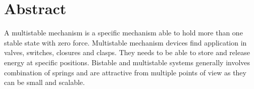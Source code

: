 \section*{Abstract}
%
A multistable mechanism is a specific mechanism able to hold more than one stable state with zero force. Multistable mechanism devices find application in valves, switches, closures and clasps. They needs to be able to store and release energy at specific positions. Bistable and multistable systems generally involves combination of springs and are attractive from multiple points of view as they can be small and scalable. \\